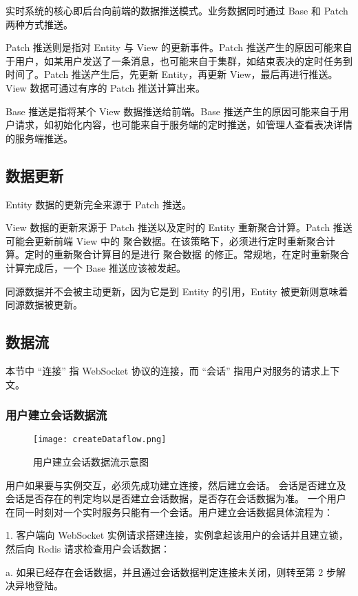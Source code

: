 实时系统的核心即后台向前端的数据推送模式。业务数据同时通过 Base 和 Patch 两种方式推送。

Patch 推送则是指对 Entity 与 View 的更新事件。Patch 推送产生的原因可能来自于用户，如某用户发送了一条消息，也可能来自于集群，如结束表决的定时任务到时间了。Patch 推送产生后，先更新 Entity，再更新 View，最后再进行推送。View 数据可通过有序的 Patch 推送计算出来。

Base 推送是指将某个 View 数据推送给前端。Base 推送产生的原因可能来自于用户请求，如初始化内容，也可能来自于服务端的定时推送，如管理人查看表决详情的服务端推送。

\subsection{数据更新}

Entity 数据的更新完全来源于 Patch 推送。

View 数据的更新来源于 Patch 推送以及定时的 Entity 重新聚合计算。Patch 推送可能会更新前端 View 中的 聚合数据。在该策略下，必须进行定时重新聚合计算。定时的重新聚合计算目的是进行 聚合数据 的修正。常规地，在定时重新聚合计算完成后，一个 Base 推送应该被发起。

同源数据并不会被主动更新，因为它是到 Entity 的引用，Entity 被更新则意味着同源数据被更新。

\subsection{数据流}
本节中 “连接” 指 WebSocket 协议的连接，而 “会话” 指用户对服务的请求上下文。
\subsubsection{用户建立会话数据流}
\begin{figure}[!htp]
  \centering
  \texttt{[image: createDataflow.png]}
  \caption[建立数据流]
    {用户建立会话数据流示意图}
 \label{fig:createDataflow}
\end{figure}
用户如果要与实例交互，必须先成功建立连接，然后建立会话。
会话是否建立及会话是否存在的判定均以是否建立会话数据，是否存在会话数据为准。
一个用户在同一时刻对一个实时服务只能有一个会话。用户建立会话数据具体流程为：

1. 客户端向 WebSocket 实例请求搭建连接，实例拿起该用户的会话并且建立锁，然后向 Redis 请求检查用户会话数据：

\quad{}\quad{}a. 如果已经存在会话数据，并且通过会话数据判定连接未关闭，则转至第 2 步解决异地登陆。

